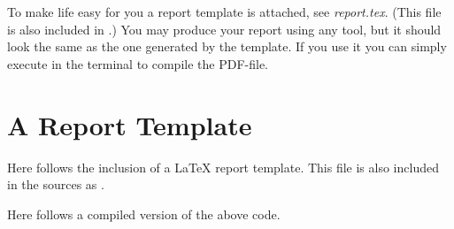 \documentclass[a4paper,nocourse]{miunasgn}
\begin{document}
To make life easy for you a report template is attached, see \emph{report.tex}.
(This file is also included in .)
You may produce your report using any tool, but it should look the same as the 
one generated by the template.
If you use it you can simply execute  in the terminal to 
compile the PDF-file.


\printbibliography


\appendix
\section{A Report Template}
\label{app:report}
Here follows the inclusion of a LaTeX report template.
This file is also included in the sources as .



Here follows a compiled version of the above code.


\end{document}

